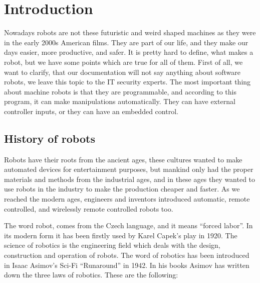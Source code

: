 \newpage

\thispagestyle{empty}

\chapter{Introduction}

	\hspace{15pt}Nowadays robots are not these futuristic and weird shaped machines as they were in the early 2000s American films. They are part of our life, and they make our days easier, more productive, and safer. It is pretty hard to define, what makes a robot, but we have some points which are true for all of them. First of all, we want to clarify, that our documentation will not say anything about software robots, we leave this topic to the IT security experts. The most important thing about machine robots is that they are programmable, and according to this program, it can make manipulations automatically. They can have external controller inputs, or they can have an embedded control. \cite{robotics2}






	\section{History of robots}

		\hspace{15pt}Robots have their roots from the ancient ages, these cultures wanted to make automated devices for entertainment purposes, but mankind only had the proper materials and methods from the industrial ages, and in these ages they wanted to use robots in the industry to make the production cheaper and faster. As we reached the modern ages, engineers and inventors introduced automatic, remote controlled, and wirelessly remote controlled robots too.	\cite{robotics1}


		The word robot, comes from the Czech language, and it means “forced labor”. In its modern form it has been firstly used by Karel Capek’s play in 1920. The science of robotics is the engineering field which deals with the design, construction and operation of robots. The word of robotics has been introduced in Isaac Asimov’s Sci-Fi “Runaround” in 1942. In his books Asimov has written down the three laws of robotics. These are the following: \cite{robotics1}

